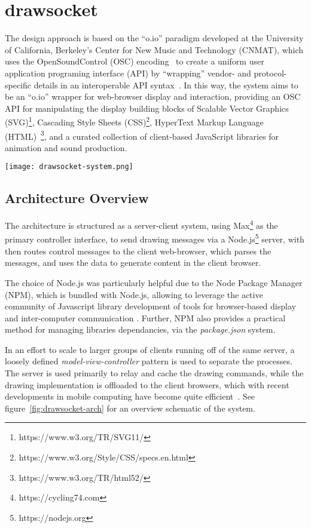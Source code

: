 \section{drawsocket}\label{sec:drawsocket}
The \drawsocket design approach is based on the ``o.io'' paradigm developed at the University of California, Berkeley's Center for New Music and Technology (CNMAT), which uses the OpenSoundControl (OSC) encoding~\cite{wright:osc} to create a uniform user application programing interface (API) by ``wrapping'' vendor- and protocol- specific details in an interoperable API syntax~\cite{freed2014io, maccallum2015dynamic}.
In this way, the \drawsocket system aims to be an ``o.io'' wrapper for web-browser display and interaction, providing an OSC API for manipulating the display building blocks of Scalable Vector Graphics (SVG)\footnote{https://www.w3.org/TR/SVG11/}, Cascading Style Sheets (CSS)\footnote{https://www.w3.org/Style/CSS/specs.en.html}, HyperText Markup Language (HTML)~\footnote{https://www.w3.org/TR/html52/}, and a curated collection of client-based JavaScript libraries for animation and sound production.

\begin{figure*}[]
\centering
\texttt{[image: drawsocket-system.png]}
\caption{\drawsocket Sever/Client Architecture. 
\label{fig:drawsocket-arch}}
\end{figure*}

\subsection{Architecture Overview}
The \drawsocket architecture is structured as a server-client system, using Max\footnote{https://cycling74.com}  as the primary controller interface, to send drawing messages via a Node.js\footnote{https://nodejs.org} server, with then routes control messages to the client web-browser, which parses the messages, and uses the data to generate content in the client browser. 

The choice of Node.js was particularly helpful due to the Node Package Manager (NPM), which is bundled with Node.js, allowing \drawsocket to leverage the active community of Javascript library development of tools for browser-based display and inter-computer communication \cite{trockman2018adding}. 
Further, NPM also provides a practical method for managing libraries dependancies, via the \textit{package.json} system.

In an effort to scale to larger groups of clients running off of the same server, a loosely defined \textit{model-view-controller} \cite{krasner1988description} pattern is used to separate the processes. 
The server is used primarily to relay and cache the drawing commands, while the drawing implementation is offloaded to the client browsers, which with recent developments in mobile computing have become quite efficient~\cite{halpern2016mobile}.
See figure~\ref{fig:drawsocket-arch} for an overview schematic of the system. 

